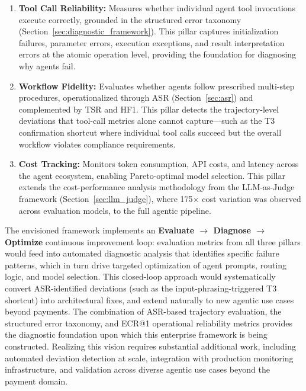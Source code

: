 \begin{enumerate}[leftmargin=*]
    \item \textbf{Tool Call Reliability:} Measures whether individual agent tool invocations execute correctly, grounded in the structured error taxonomy (Section~\ref{sec:diagnostic_framework}). This pillar captures initialization failures, parameter errors, execution exceptions, and result interpretation errors at the atomic operation level, providing the foundation for diagnosing why agents fail.

    \item \textbf{Workflow Fidelity:} Evaluates whether agents follow prescribed multi-step procedures, operationalized through ASR (Section~\ref{sec:asr}) and complemented by TSR and HF1. This pillar detects the trajectory-level deviations that tool-call metrics alone cannot capture---such as the T3 confirmation shortcut where individual tool calls succeed but the overall workflow violates compliance requirements.

    \item \textbf{Cost Tracking:} Monitors token consumption, API costs, and latency across the agent ecosystem, enabling Pareto-optimal model selection. This pillar extends the cost-performance analysis methodology from the LLM-as-Judge framework (Section~\ref{sec:llm_judge}), where 175$\times$ cost variation was observed across evaluation models, to the full agentic pipeline.
\end{enumerate}

The envisioned framework implements an \textbf{Evaluate $\rightarrow$ Diagnose $\rightarrow$ Optimize} continuous improvement loop: evaluation metrics from all three pillars would feed into automated diagnostic analysis that identifies specific failure patterns, which in turn drive targeted optimization of agent prompts, routing logic, and model selection. This closed-loop approach would systematically convert ASR-identified deviations (such as the input-phrasing-triggered T3 shortcut) into architectural fixes, and extend naturally to new agentic use cases beyond payments. The combination of ASR-based trajectory evaluation, the structured error taxonomy, and ECR@1 operational reliability metrics provides the diagnostic foundation upon which this enterprise framework is being constructed. Realizing this vision requires substantial additional work, including automated deviation detection at scale, integration with production monitoring infrastructure, and validation across diverse agentic use cases beyond the payment domain.

